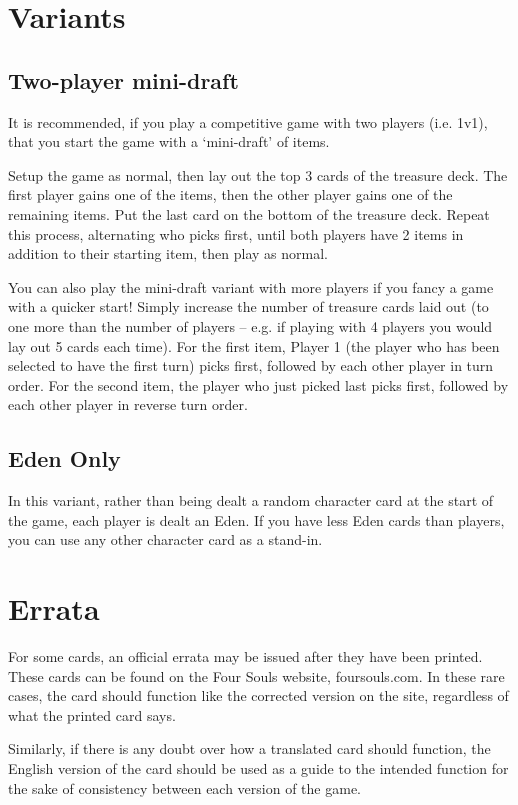 \documentclass[10pt, a4paper, twoside]{article} %
\begin{document}
    \section{Variants}
    \subsection{Two-player mini-draft}
    It is recommended, if you play a competitive game with two players (i.e. 1v1), that you start the game with a ‘mini-draft’ of items.
    
    Setup the game as normal, then lay out the top 3 cards of the treasure deck. The first player gains one of the items, then the other player gains one of the remaining items. Put the last card on the bottom of the treasure deck. Repeat this process, alternating who picks first, until both players have 2 items in addition to their starting item, then play as normal.
    
    You can also play the mini-draft variant with more players if you fancy a game with a quicker start! Simply increase the number of treasure cards laid out (to one more than the number of players – e.g. if playing with 4 players you would lay out 5 cards each time). For the first item, Player 1 (the player who has been selected to have the first turn) picks first, followed by each other player in turn order. For the second item, the player who just picked last picks first, followed by each other player in reverse turn order.
    \subsection{Eden Only}
    In this variant, rather than being dealt a random character card at the start of the game, each player is dealt an Eden. If you have less Eden cards than players, you can use any other character card as a stand-in.
    \section{Errata}
    For some cards, an official errata may be issued after they have been printed. These cards can be found on the Four Souls website, foursouls.com. In these rare cases, the card should function like the corrected version on the site, regardless of what the printed card says.
    
    Similarly, if there is any doubt over how a translated card should function, the English version of the card should be used as a guide to the intended function for the sake of consistency between each version of the game.
\end{document}
